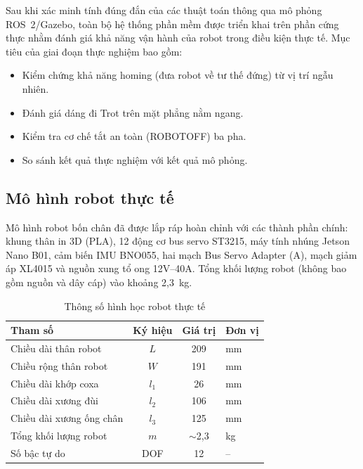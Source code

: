 Sau khi xác minh tính đúng đắn của các thuật toán thông qua mô phỏng ROS~2/Gazebo, toàn bộ hệ thống phần mềm được triển khai trên phần cứng thực nhằm đánh giá khả năng vận hành của robot trong điều kiện thực tế. Mục tiêu của giai đoạn thực nghiệm bao gồm:

\begin{itemize}
    \item Kiểm chứng khả năng homing (đưa robot về tư thế đứng) từ vị trí ngẫu nhiên.
    \item Đánh giá dáng đi Trot trên mặt phẳng nằm ngang.
    \item Kiểm tra cơ chế tắt an toàn (ROBOTOFF) ba pha.
    \item So sánh kết quả thực nghiệm với kết quả mô phỏng.
\end{itemize}

\subsection{Mô hình robot thực tế}

Mô hình robot bốn chân đã được lắp ráp hoàn chỉnh với các thành phần chính: khung thân in 3D (PLA), 12 động cơ bus servo ST3215, máy tính nhúng Jetson Nano B01, cảm biến IMU BNO055, hai mạch Bus Servo Adapter (A), mạch giảm áp XL4015 và nguồn xung tổ ong 12V--40A. Tổng khối lượng robot (không bao gồm nguồn và dây cáp) vào khoảng 2,3~kg.

\begin{table}[H]
\centering
\caption{Thông số hình học robot thực tế}
\label{tab:hw_robot_params}
\renewcommand{\arraystretch}{1.3}
\begin{tabular}{|l|c|c|l|}
\hline
\textbf{Tham số} & \textbf{Ký hiệu} & \textbf{Giá trị} & \textbf{Đơn vị} \\ \hline
Chiều dài thân robot & $L$ & 209 & mm \\ \hline
Chiều rộng thân robot & $W$ & 191 & mm \\ \hline
Chiều dài khớp coxa & $l_1$ & 26 & mm \\ \hline
Chiều dài xương đùi & $l_2$ & 106 & mm \\ \hline
Chiều dài xương ống chân & $l_3$ & 125 & mm \\ \hline
Tổng khối lượng robot & $m$ & $\sim$2,3 & kg \\ \hline
Số bậc tự do & DOF & 12 & -- \\ \hline
\end{tabular}
\end{table}

